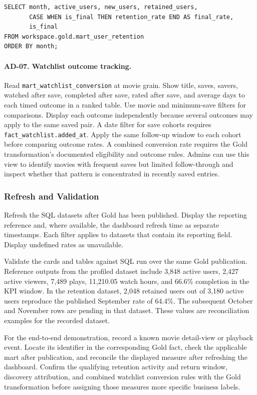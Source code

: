 \documentclass[a4paper,12pt]{article}
\newcommand{\dbsep}{\_\allowbreak}
\begin{document}
\begingroup
\small
\begin{verbatim}
SELECT month, active_users, new_users, retained_users,
       CASE WHEN is_final THEN retention_rate END AS final_rate,
       is_final
FROM workspace.gold.mart_user_retention
ORDER BY month;
\end{verbatim}
\endgroup

\paragraph{AD-07. Watchlist outcome tracking.}
Read \texttt{mart\dbsep watchlist\dbsep conversion} at movie grain.
Show title, saves, savers, watched after save, completed after save,
rated after save, and average days to each timed outcome in a ranked
table. Use movie and minimum-save filters for comparisons. Display
each outcome independently because several outcomes may apply to the
same saved pair. A date filter for save cohorts requires
\texttt{fact\dbsep watchlist.added\_at}. Apply the same follow-up
window to each cohort before comparing outcome rates. A combined
conversion rate requires the Gold transformation's documented
eligibility and outcome rules. Admins can use this view to identify
movies with frequent saves but limited follow-through and inspect
whether that pattern is concentrated in recently saved entries.

\subsubsection{Refresh and Validation}

Refresh the SQL datasets after Gold has been published. Display the
reporting reference and, where available, the dashboard refresh time
as separate timestamps. Each filter applies to datasets that contain
its reporting field. Display undefined rates as unavailable.

Validate the cards and tables against SQL run over the same Gold
publication. Reference outputs from the profiled dataset include
3,848 active users, 2,427 active viewers, 7,489 plays, 11,210.05
watch hours, and 66.6\% completion in the KPI window. In the
retention dataset, 2,048 retained users out of 3,180 active users
reproduce the published September rate of 64.4\%. The subsequent
October and November rows are pending in that dataset. These values
are reconciliation examples for the recorded dataset.

For the end-to-end demonstration, record a known movie detail-view
or playback event. Locate its identifier in the corresponding Gold
fact, check the applicable mart after publication, and reconcile
the displayed measure after refreshing the dashboard. Confirm the
qualifying retention activity and return window, discovery
attribution, and combined watchlist conversion rules with the
Gold transformation before assigning those measures more specific
business labels.
\end{document}
